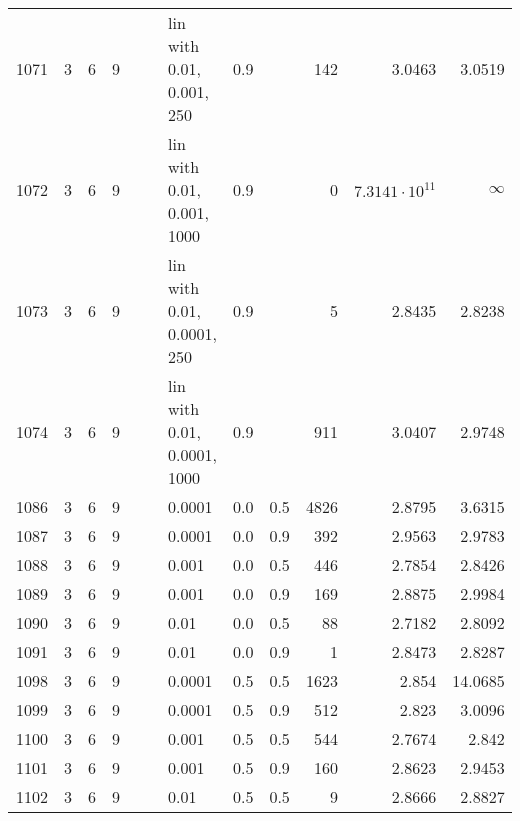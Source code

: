 \begin{longtable}{lrrrrrlrrrrr}
 1071 &       3 & 6 & 9 &   &   &   lin with 0.01, 0.001, 250 &      0.9 &        &     142 &                 3.0463 &                 3.0519 \\
 1072 &       3 & 6 & 9 &   &   &  lin with 0.01, 0.001, 1000 &      0.9 &        &       0 &  $7.3141\cdot 10^{11}$ &               $\infty$ \\
 1073 &       3 & 6 & 9 &   &   &  lin with 0.01, 0.0001, 250 &      0.9 &        &       5 &                 2.8435 &                 2.8238 \\
 1074 &       3 & 6 & 9 &   &   & lin with 0.01, 0.0001, 1000 &      0.9 &        &     911 &                 3.0407 &                 2.9748 \\
 1086 &       3 & 6 & 9 &   &   &                      0.0001 &      0.0 &    0.5 &    4826 &                 2.8795 &                 3.6315 \\
 1087 &       3 & 6 & 9 &   &   &                      0.0001 &      0.0 &    0.9 &     392 &                 2.9563 &                 2.9783 \\
 1088 &       3 & 6 & 9 &   &   &                       0.001 &      0.0 &    0.5 &     446 &                 2.7854 &                 2.8426 \\
 1089 &       3 & 6 & 9 &   &   &                       0.001 &      0.0 &    0.9 &     169 &                 2.8875 &                 2.9984 \\
 1090 &       3 & 6 & 9 &   &   &                        0.01 &      0.0 &    0.5 &      88 &                 2.7182 &                 2.8092 \\
 1091 &       3 & 6 & 9 &   &   &                        0.01 &      0.0 &    0.9 &       1 &                 2.8473 &                 2.8287 \\
 1098 &       3 & 6 & 9 &   &   &                      0.0001 &      0.5 &    0.5 &    1623 &                  2.854 &                14.0685 \\
 1099 &       3 & 6 & 9 &   &   &                      0.0001 &      0.5 &    0.9 &     512 &                  2.823 &                 3.0096 \\
 1100 &       3 & 6 & 9 &   &   &                       0.001 &      0.5 &    0.5 &     544 &                 2.7674 &                  2.842 \\
 1101 &       3 & 6 & 9 &   &   &                       0.001 &      0.5 &    0.9 &     160 &                 2.8623 &                 2.9453 \\
 1102 &       3 & 6 & 9 &   &   &                        0.01 &      0.5 &    0.5 &       9 &                 2.8666 &                 2.8827 \\

\end{longtable}
